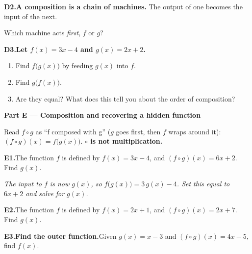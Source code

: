 \documentclass[12pt, twoside]{article}
\begin{document}
\medskip
\noindent\textbf{D2.\quad A composition is a chain of machines.} The output of one becomes
the input of the next.
\begin{center}
\end{center}
\noindent Which machine acts \emph{first}, $f$ or $g$? \underline{\hspace{3cm}}

\medskip
\noindent\textbf{D3.\quad Let $f(x)=3x-4$ and $g(x)=2x+2$.}
\begin{enumerate}[itemsep=0.1cm, label=(\alph*)]
  \item Find $f\big(g(x)\big)$ by feeding $g(x)$ into $f$. \vfill
  \item Find $g\big(f(x)\big)$. \vfill
  \item Are they equal? What does this tell you about the order of composition? \vfill
\end{enumerate}

\newpage

\noindent\textbf{\large Part E --- Composition and recovering a hidden function}

\medskip
\noindent Read $f\circ g$ as ``f composed with g'' ($g$ goes first, then $f$ wraps around it):
$(f\circ g)(x)=f\big(g(x)\big)$. \quad\textbf{$\circ$ is not multiplication.}

\medskip
\noindent\textbf{E1.}\quad The function $f$ is defined by $f(x)=3x-4$, and
$(f\circ g)(x)=6x+2$. Find $g(x)$.

\noindent\emph{The input to $f$ is now $g(x)$, so $f\big(g(x)\big)=3\,g(x)-4$. Set this
equal to $6x+2$ and solve for $g(x)$.}
\vfill

\noindent\textbf{E2.}\quad The function $f$ is defined by $f(x)=2x+1$, and
$(f\circ g)(x)=2x+7$. Find $g(x)$.
\vfill

\noindent\textbf{E3.\quad Find the outer function.}\quad Given $g(x)=x-3$ and
$(f\circ g)(x)=4x-5$, find $f(x)$.
\end{document}

